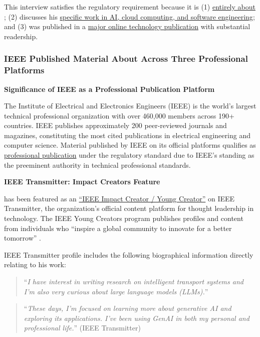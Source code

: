 This interview satisfies the regulatory requirement because it is (1) \underline{entirely about \dr}; (2) discusses his \underline{specific work in AI, cloud computing, and software engineering}; and (3) was published in a \underline{major online technology publication} with substantial readership.


\subsubsection{IEEE Published Material About \dr Across Three Professional Platforms}
\label{media:ieee}

\textbf{Significance of IEEE as a Professional Publication Platform}

The Institute of Electrical and Electronics Engineers (IEEE) is the world's largest technical professional organization with over 460,000 members across 190+ countries. IEEE publishes approximately 200 peer-reviewed journals and magazines, constituting the most cited publications in electrical engineering and computer science. Material published by IEEE on its official platforms qualifies as \underline{professional publication} under the regulatory standard due to IEEE's standing as the preeminent authority in technical professional standards.

\textbf{IEEE Transmitter: Impact Creators Feature}

\dr has been featured as an \underline{``IEEE Impact Creator / Young Creator''} on IEEE Transmitter, the organization's official content platform for thought leadership in technology. The IEEE Young Creators program publishes profiles and content from individuals who ``inspire a global community to innovate for a better tomorrow'' \cite{PM2}.

\drs IEEE Transmitter profile includes the following biographical information directly relating to his work:

\begin{quote}
``\textit{I have interest in writing research on intelligent transport systems and I'm also very curious about large language models (LLMs).}''
\end{quote}

\begin{quote}
``\textit{These days, I'm focused on learning more about generative AI and exploring its applications. I've been using GenAI in both my personal and professional life.}'' (IEEE Transmitter)
\end{quote}


